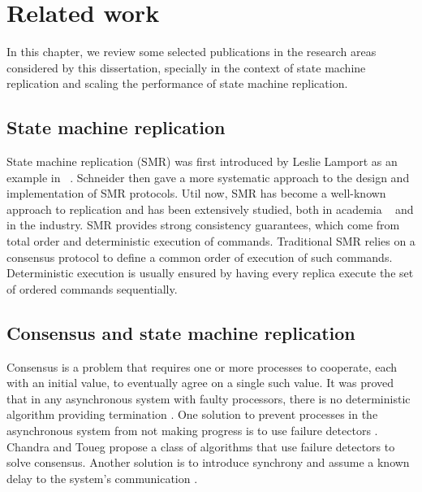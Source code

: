 \chapter[Related work]{Related work}
\label{sec:rw}

In this chapter, we review some selected publications in the research areas considered
by this dissertation, specially in the context of state machine replication and scaling
the performance of state machine replication.

\section{State machine replication}

State machine replication (SMR) was first introduced by Leslie Lamport as an
example in ~\cite{Lam78}. Schneider \cite{Sch90} then gave a more systematic
approach to the design and implementation of SMR protocols. Util now, SMR has
become a well-known approach to replication and has been extensively studied,
both in academia ~\cite{Kapritsos:2012um, Kotla:2004ep, santos2013htsmr,
Mencius} and in the industry. SMR provides strong consistency guarantees, which
come from total order and deterministic execution of commands. Traditional SMR
relies on a consensus protocol to define a common order of execution of such
commands. Deterministic execution is usually ensured by having every replica
execute the set of ordered commands sequentially.


\section{Consensus and state machine replication}

Consensus \cite{Lam78, paprzycki:2001distributed} is a problem that requires one
or more processes to cooperate, each with an initial value, to eventually agree on
a single such value. It was proved that in any asynchronous system with faulty
processors, there is no deterministic algorithm providing termination
\cite{FLP85}. One solution to prevent processes in the asynchronous system from
not making progress is to use failure detectors \cite{aguilera:2000failure}.
Chandra and Toueg \cite{CT96} propose a class of algorithms that use failure
detectors to solve consensus. Another solution is to introduce synchrony and
assume a known delay to the system's communication \cite{Aspnes:2003vp}.

